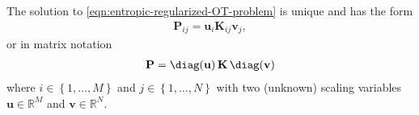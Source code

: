 \begin{proposition}
  The solution to \cref{eqn:entropic-regularized-OT-problem} is unique and has the form
  \begin{equation}\label{eqn:regularized-OT-solution}
    \begin{aligned}
      \mathbf{P}_{ij} = \mathbf{u}_i \mathbf{K}_{ij} \mathbf{v}_j,
    \end{aligned}
  \end{equation}
  or in matrix notation
  \begin{equation}\label{eqn:regularized-OT-solution-matrix-form}
    \begin{aligned}
      \mathbf{P} = \diag(\mathbf{u}) \,\mathbf{K} \,\diag(\mathbf{v})
    \end{aligned}
  \end{equation}
  where $i \in \left\{1, \ldots, M\right\}$ and $j \in \left\{1, \ldots, N\right\}$ with two (unknown)
  scaling variables $\mathbf{u} \in \mathbb{R}^M$ and $\mathbf{v} \in \mathbb{R}^N$.
\end{proposition}

